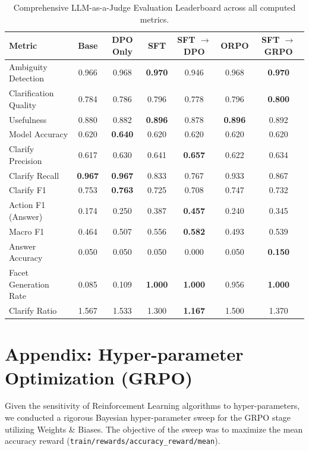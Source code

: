 \documentclass{article}
\theoremstyle{plain}
\theoremstyle{definition}
\theoremstyle{remark}
\begin{document}
\begin{table}[!ht]
  \caption{Comprehensive LLM-as-a-Judge Evaluation Leaderboard across all computed metrics.}
  \label{tab:full_eval}
  \begin{center}
    \begin{small}
      \begin{sc}
        \begin{tabular}{lcccccc}
          \toprule
          Metric & Base & DPO Only & SFT & SFT $\rightarrow$ DPO & ORPO & SFT $\rightarrow$ GRPO \\
          \midrule
          Ambiguity Detection & 0.966 & 0.968 & \textbf{0.970} & 0.946 & 0.968 & \textbf{0.970} \\
          Clarification Quality & 0.784 & 0.786 & 0.796 & 0.778 & 0.796 & \textbf{0.800} \\
          Usefulness & 0.880 & 0.882 & \textbf{0.896} & 0.878 & \textbf{0.896} & 0.892 \\
          Model Accuracy & 0.620 & \textbf{0.640} & 0.620 & 0.620 & 0.620 & 0.620 \\
          Clarify Precision & 0.617 & 0.630 & 0.641 & \textbf{0.657} & 0.622 & 0.634 \\
          Clarify Recall & \textbf{0.967} & \textbf{0.967} & 0.833 & 0.767 & 0.933 & 0.867 \\
          Clarify F1 & 0.753 & \textbf{0.763} & 0.725 & 0.708 & 0.747 & 0.732 \\
          Action F1 (Answer) & 0.174 & 0.250 & 0.387 & \textbf{0.457} & 0.240 & 0.345 \\
          Macro F1 & 0.464 & 0.507 & 0.556 & \textbf{0.582} & 0.493 & 0.539 \\
          Answer Accuracy & 0.050 & 0.050 & 0.050 & 0.000 & 0.050 & \textbf{0.150} \\
          Facet Generation Rate & 0.085 & 0.109 & \textbf{1.000} & \textbf{1.000} & 0.956 & \textbf{1.000} \\
          Clarify Ratio & 1.567 & 1.533 & 1.300 & \textbf{1.167} & 1.500 & 1.370 \\
          \bottomrule
        \end{tabular}
      \end{sc}
    \end{small}
  \end{center}
\end{table}

\section{Appendix: Hyper-parameter Optimization (GRPO)}
\label{sec:appendix_hyperparams}
Given the sensitivity of Reinforcement Learning algorithms to hyper-parameters, we conducted a rigorous Bayesian hyper-parameter sweep for the GRPO stage utilizing Weights \& Biases. The objective of the sweep was to maximize the mean accuracy reward (\texttt{train/rewards/accuracy\_reward/mean}). 
\end{document}
